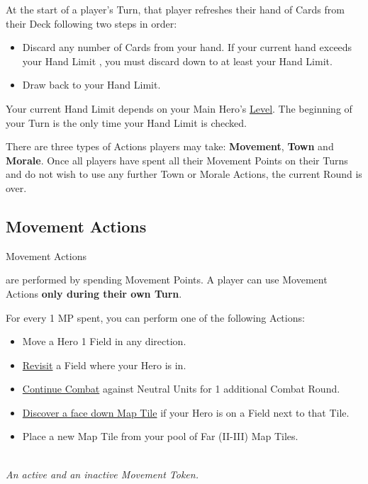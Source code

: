 
\begin{multicols}{2}

At the start of a player's Turn, that player refreshes their hand of Cards from their Deck following two steps in order:
\begin{itemize}
  \item Discard any number of Cards from your hand.
If your current hand exceeds your Hand Limit , you must discard down to at least your Hand Limit.
  \item Draw back to your Hand Limit.
\end{itemize}
Your current Hand Limit depends on your Main Hero's \hyperlink{Level}{Level}.
The beginning of your Turn is the only time your Hand Limit is checked.\par
There are three types of Actions players may take: \textbf{Movement}, \textbf{Town} and \textbf{Morale}.
Once all players have spent all their Movement Points on their Turns and do not wish to use any further Town or Morale Actions, the current Round is over.
\subsection*{Movement Actions}
\hypertarget{Movement}{Movement Actions} are performed by spending Movement Points.
A player can use Movement Actions \textbf{only during their own Turn}.\par
For every 1 MP spent, you can perform one of the following Actions:
\begin{itemize}
  \item Move a Hero 1 Field in any direction.
  \item \hyperlink{Categories}{Revisit} a Field where your Hero is in.
  \item \hyperlink{Timelimit}{Continue Combat} against Neutral Units for 1 additional Combat Round.
  \item \hyperlink{Placing}{Discover a face down Map Tile} if your Hero is on a Field next to that Tile.
  \item Place a new Map Tile from your pool of Far (II-III) Map Tiles.
\end{itemize}

\begin{center}
  \\
  \medskip
  \footnotesize\textit{An active and an inactive Movement Token.}
\end{center}


\end{multicols}
